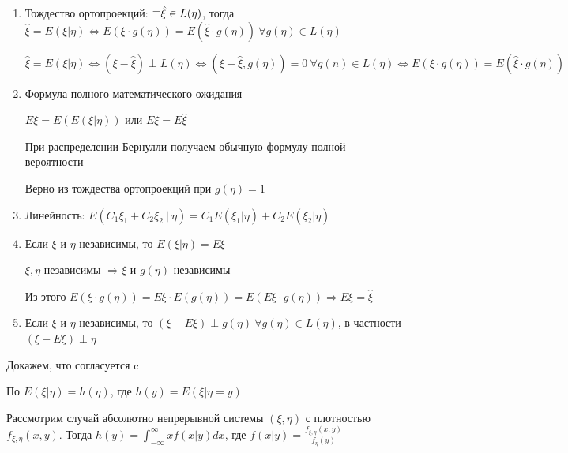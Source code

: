 \documentclass[12pt]{article}
\begin{document}
\begin{enumerate}

    \item Тождество ортопроекций: $\mathord{\sqsupset} \hat{\xi} \in L(\eta)$, тогда $\hat{\xi} = E(\xi|\eta) \Longleftrightarrow E(\xi\cdot g(\eta)) = E(\hat{\xi}\cdot g(\eta)) \ \forall g(\eta) \in L(\eta)$

    \begin{MyProof}
        $\hat{\xi} = E(\xi|\eta) \Longleftrightarrow (\xi - \hat{\xi}) \perp L(\eta) \Longleftrightarrow 
        (\xi - \hat{\xi}, g(\eta)) = 0 \ \forall g(n) \in L(\eta) \Longleftrightarrow E(\xi\cdot g(\eta)) = E(\hat{\xi}\cdot g(\eta))$
    \end{MyProof}

    \item Формула полного математического ожидания

    $E\xi = E(E(\xi|\eta))$ или $E\xi = E\hat{\xi}$

    \Nota При распределении Бернулли получаем обычную формулу полной вероятности

    \begin{MyProof}
        Верно из тождества ортопроекций при $g(\eta) = 1$
    \end{MyProof}

    \item Линейность: $E(C_1\xi_1 + C_2\xi_2 \ | \ \eta) = C_1 E(\xi_1|\eta) + C_2 E(\xi_2|\eta)$

    \item Если $\xi$ и $\eta$ независимы, то $E(\xi|\eta) = E\xi$

    \begin{MyProof}
        $\xi, \eta$ независимы $\Longrightarrow \xi$ и $g(\eta)$ независимы

        Из этого $E(\xi \cdot g(\eta)) = E\xi \cdot E(g(\eta)) = E(E\xi \cdot g(\eta)) \Longrightarrow E\xi = \hat{\xi}$
    \end{MyProof}

    \item Если $\xi$ и $\eta$ независимы, то $(\xi - E\xi) \perp g(\eta) \ \forall g(\eta) \in L(\eta)$, 
    в частности $(\xi - E\xi) \perp \eta$

\end{enumerate}

Докажем, что  согласуется c 

По  $E(\xi|\eta) = h(\eta)$, где $h(y) = E(\xi|\eta = y)$

Рассмотрим случай абсолютно непрерывной системы $(\xi, \eta)$ с плотностью $f_{\xi,\eta}(x, y)$.
Тогда $h(y) = \int_{-\infty}^\infty xf(x|y)dx$, где $f(x|y) = \frac{f_{\xi,\eta}(x, y)}{f_\eta(y)}$
\end{document}
